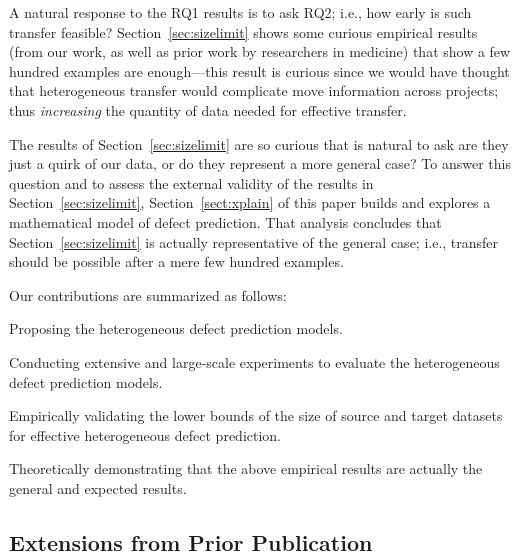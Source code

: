 A natural response to the RQ1 results is to ask RQ2; i.e., how early is such transfer
feasible?  Section~\ref{sec:sizelimit} shows some curious empirical results (from our
work, as well as prior work by researchers in medicine) that show a few hundred examples are enough---this result is curious since we would have thought that
heterogeneous transfer would complicate move information across projects;
thus {\em increasing} the quantity of data needed for effective transfer.

The results of Section~\ref{sec:sizelimit} are so curious that is natural to ask are they just a quirk of our data, or do they represent a more general case? To answer this question and to assess the external validity of the results in Section~\ref{sec:sizelimit}, Section~\ref{sect:xplain} of this paper builds and explores a mathematical model of defect prediction.
That analysis concludes that Section~\ref{sec:sizelimit} is actually representative of the general case; i.e., transfer should be possible after a mere few hundred examples.



Our contributions are summarized as follows:
\squishlist
  \item Proposing the heterogeneous defect prediction models.
  \item Conducting extensive and large-scale experiments to evaluate
  the heterogeneous defect prediction models.
  \item Empirically validating the lower bounds of the size of source and target datasets for effective heterogeneous defect prediction.
  \item Theoretically demonstrating that the above empirical results are actually
  the general and expected results.
\squishend


\subsection{Extensions from Prior Publication}

